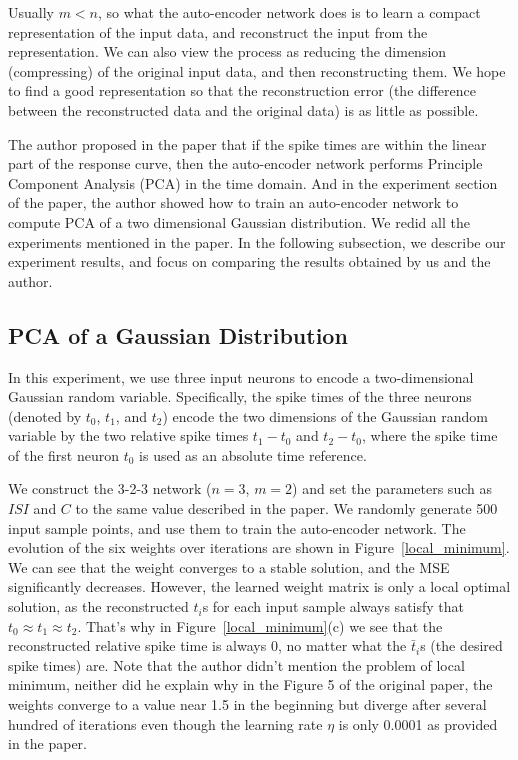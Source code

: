 Usually $m < n$, so what the auto-encoder network does is to learn a compact representation of the input data,
and reconstruct the input from the representation. 
We can also view the process as reducing the dimension (compressing) of the original input data,
and then reconstructing them.
We hope to find a good representation so that the reconstruction error (the difference between the reconstructed
data and the original data) is as little as possible.

The author proposed in the paper that if the spike times are within the linear part of the response curve,
then the auto-encoder network performs Principle Component Analysis (PCA) in the time domain.
And in the experiment section of the paper, the author showed how to train an auto-encoder network to compute PCA
of a two dimensional Gaussian distribution.
We redid all the experiments mentioned in the paper. 
In the following subsection, 
we describe our experiment results, and focus on comparing the results obtained by us and the author.

\subsection{PCA of a Gaussian Distribution}

In this experiment, we use three input neurons to encode a two-dimensional Gaussian random variable.
Specifically, the spike times of the three neurons (denoted by $t_0$, $t_1$, and $t_2$) encode the two 
dimensions of the Gaussian random variable by the two relative spike times $t_1 - t_0$ and $t_2 - t_0$, 
where the spike time of the first neuron $t_0$ is used as an absolute time reference.

We construct the 3-2-3 network ($n=3$, $m=2$) and set the parameters such as $ISI$ and $C$ to the same
value described in the paper.
We randomly generate 500 input sample points, and use them to train the auto-encoder network.
The evolution of the six weights over iterations are shown in Figure~\ref{local_minimum}.
We can see that the weight converges to a stable solution, and the MSE significantly decreases.
However, the learned weight matrix is only a local optimal solution, as the reconstructed $t_i$s for each input sample
always satisfy that $t_0 \approx t_1 \approx t_2$. 
That's why in Figure~\ref{local_minimum}(c) we see that the reconstructed relative spike time is always $0$,
no matter what the $\bar t_i$s (the desired spike times) are.
Note that the author didn't mention the problem of local minimum, 
neither did he explain why in the Figure 5 of the original paper, the weights converge to a value near
1.5 in the beginning but diverge after several hundred of iterations even though the learning rate $\eta$
is only 0.0001 as provided in the paper.

